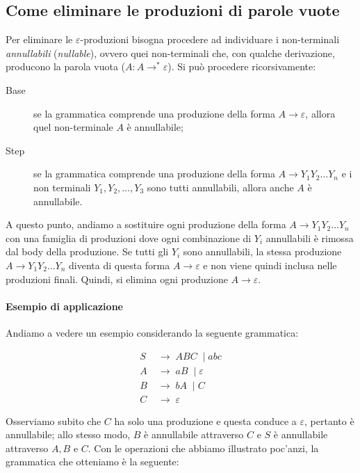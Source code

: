 \documentclass[class=book, crop=false, oneside, 12pt]{standalone}
\begin{document}
\subsection{Come eliminare le produzioni di parole vuote}
Per eliminare le \(\varepsilon\)-produzioni bisogna procedere ad individuare i non-terminali \emph{annullabili} (\emph{nullable}), ovvero quei non-terminali che, con qualche derivazione, producono la parola vuota (\(A : A \rightarrow^\ast \varepsilon\)). Si può procedere ricorsivamente:
\begin{description}
  \item[Base] se la grammatica comprende una produzione della forma \(A \rightarrow \varepsilon\), allora quel non-terminale \(A\) è annullabile;
  \item[Step] se la grammatica comprende una produzione della forma \(A \rightarrow Y_1Y_2 \ldots Y_n\) e i non terminali \(Y_1, Y_2, \ldots, Y_3\) sono tutti annullabili, allora anche \(A\) è annullabile. 
\end{description}
A questo punto, andiamo a sostituire ogni produzione della forma \(A \rightarrow Y_1Y_2 \ldots Y_n\) con una famiglia di produzioni dove ogni combinazione di \(Y_i\) annullabili è rimossa dal body della produzione. Se tutti gli \(Y_i\) sono annullabili, la stessa produzione \(A \rightarrow Y_1Y_2 \ldots Y_n\) diventa di questa forma \(A \rightarrow \varepsilon\) e non viene quindi inclusa nelle produzioni finali. Quindi, si elimina ogni produzione \(A \rightarrow \varepsilon\).

\paragraph{Esempio di applicazione}
Andiamo a vedere un esempio considerando la seguente grammatica:
%

\begin{align*}
  S\; & \to\; ABC\; \mid abc \\
  A\; & \to\; aB\; \mid \varepsilon \\
  B\; & \to\; bA\; \mid C \\
  C\; & \to\; \varepsilon
\end{align*}

Osserviamo subito che \(C\) ha solo una produzione e questa conduce a \(\varepsilon\), pertanto è annullabile; allo stesso modo, \(B\) è annullabile attraverso \(C\) e \(S\) è annullabile attraverso \(A, B\) e \(C\). Con le operazioni che abbiamo illustrato poc'anzi, la grammatica che otteniamo è la seguente:
\end{document}
